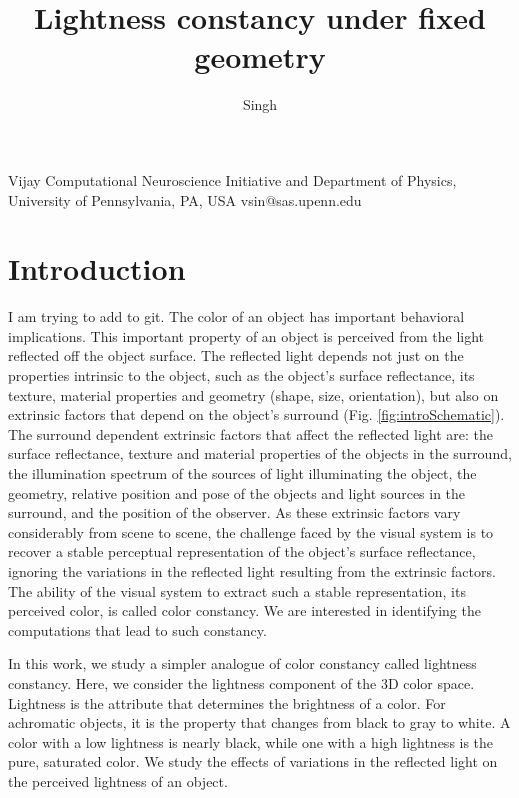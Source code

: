 \documentclass{jov}
\begin{document}
\title{Lightness constancy under fixed geometry}

\author{Singh}{Vijay}
 {Computational Neuroscience Initiative}
 {and Department of Physics, University of Pennsylvania, PA, USA}
 {}{vsin@sas.upenn.edu}


\maketitle

\section{Introduction}
I am trying to add to git.
The color of an object has important behavioral implications. This important property of an object is perceived from the light reflected off the object surface. The reflected light depends not just on the properties intrinsic to the object, such as the object's surface reflectance, its texture, material properties and geometry (shape, size, orientation), but also on extrinsic factors that depend on the object's surround (Fig. \ref{fig:introSchematic}). The surround dependent extrinsic factors that affect the reflected light are: the surface reflectance, texture and material properties of the objects in the surround, the illumination spectrum of the sources of light illuminating the object, the geometry, relative position and pose of the objects and light sources in the surround, and the position of the observer. As these extrinsic factors vary considerably from scene to scene, the challenge faced by the visual system is to recover a stable perceptual representation of the object's surface reflectance, ignoring the  variations in the reflected light resulting from the extrinsic factors. The ability of the visual system to extract such a stable representation, its perceived color, is called color constancy. We are interested in identifying the computations that lead to such constancy.

In this work, we study a simpler analogue of color constancy called lightness constancy. Here, we consider the lightness component of the 3D color space. Lightness is the attribute that determines the brightness of a color. For achromatic objects, it is the property that changes from black to gray to white. A color with a low lightness is nearly black, while one with a high lightness is the pure, saturated color. We study the effects of variations in the reflected light on the perceived lightness of an object.
\end{document}
